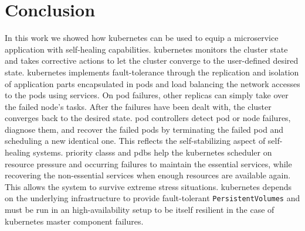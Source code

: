 
\section{Conclusion}\label{sec:conclusion}
  In this work we showed how \gls{kubernetes} can be used to equip a microservice application with self-healing capabilities.
  \Gls{kubernetes} monitors the cluster state and takes corrective actions to let the cluster converge to the user-defined desired state.
  \Gls{kubernetes} implements fault-tolerance through the replication and isolation of application parts encapsulated in pods and load balancing the network accesses to the pods using \glspl{service}.
  On pod failures, other replicas can simply take over the failed node's tasks.
  After the failures have been dealt with, the cluster converges back to the desired state.
  \Glspl{pod controller} detect pod or node failures, diagnose them, and recover the failed pods by terminating the failed pod and scheduling a new identical one.
  This reflects the self-stabilizing aspect of self-healing systems.
  \Glspl{priority class} and \glspl{pdb} help the \gls{kubernetes} scheduler on resource pressure and occurring failures to maintain the essential services, while recovering the non-essential services when enough resources are available again.
  This allows the system to survive extreme stress situations.
  \Gls{kubernetes} depends on the underlying infrastructure to provide fault-tolerant \texttt{PersistentVolumes} and must be run in an high-availability setup to be itself resilient in the case of \gls{kubernetes} master component failures.